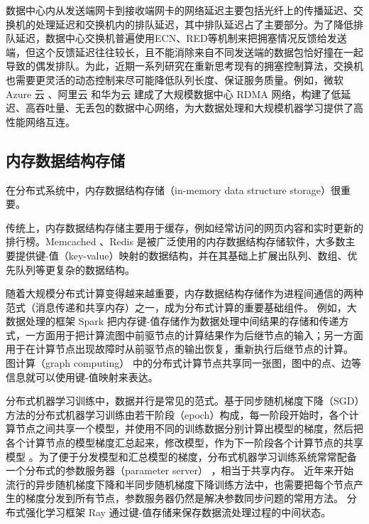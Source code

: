 数据中心内从发送端网卡到接收端网卡的网络延迟主要包括光纤上的传播延迟、交换机的处理延迟和交换机内的排队延迟，其中排队延迟占了主要部分。为了降低排队延迟，数据中心交换机普遍使用ECN、RED等机制来把拥塞情况反馈给发送端，但这个反馈延迟往往较长，且不能消除来自不同发送端的数据包恰好撞在一起导致的偶发排队。为此，近期一系列研究在重新思考现有的拥塞控制算法，交换机也需要更灵活的动态控制来尽可能降低队列长度、保证服务质量。例如，微软 Azure 云 \cite{guo2016rdma}、阿里云 \cite{aliyun-rdma} 和华为云 \cite{huawei-lossless} 建成了大规模数据中心 RDMA 网络，构建了低延迟、高吞吐量、无丢包的数据中心网络，为大数据处理和大规模机器学习提供了高性能网络互连。


\subsection{内存数据结构存储}

在分布式系统中，内存数据结构存储（in-memory data structure storage）很重要。

传统上，内存数据结构存储主要用于缓存，例如经常访问的网页内容和实时更新的排行榜。Memcached \cite{memcached}、Redis \cite{redis} 是被广泛使用的内存数据结构存储软件，大多数主要提供键-值（key-value）映射的数据结构，并在其基础上扩展出队列、数组、优先队列等更复杂的数据结构。

随着大规模分布式计算变得越来越重要，内存数据结构存储作为进程间通信的两种范式（消息传递和共享内存）之一，成为分布式计算的重要基础组件。
例如，大数据处理的框架 Spark 把内存键-值存储作为数据处理中间结果的存储和传递方式，一方面用于把计算流图中前驱节点的计算结果作为后继节点的输入；另一方面用于在计算节点出现故障时从前驱节点的输出恢复，重新执行后继节点的计算。
图计算（graph computing）\cite{wu2015g,xiao17tux2} 中的分布式计算节点共享同一张图，图中的点、边等信息就可以使用键-值映射来表达。

分布式机器学习训练中，数据并行是常见的范式。基于同步随机梯度下降（SGD）方法的分布式机器学习训练由若干阶段（epoch）构成，每一阶段开始时，各个计算节点之间共享一个模型，并使用不同的训练数据分别计算出模型的梯度，然后把各个计算节点的模型梯度汇总起来，修改模型，作为下一阶段各个计算节点的共享模型 \cite{distributed-ml}。为了便于分发模型和汇总模型的梯度，分布式机器学习训练系统常常配备一个分布式的参数服务器（parameter server） \cite{li2014scaling}，相当于共享内存。
近年来开始流行的异步随机梯度下降和半同步随机梯度下降训练方法中，也需要把每个节点产生的梯度分发到所有节点，参数服务器仍然是解决参数同步问题的常用方法。
分布式强化学习框架 Ray \cite{moritz2018ray} 通过键-值存储来保存数据流处理过程的中间状态。

